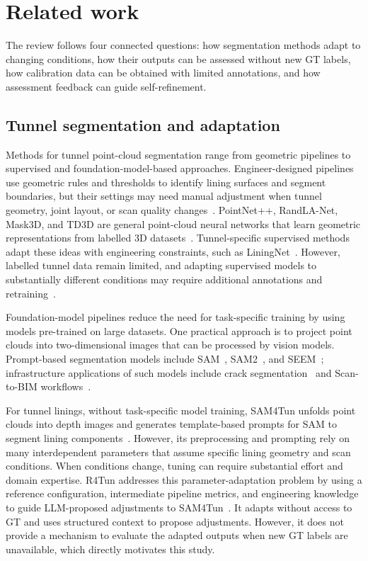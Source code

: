 \documentclass[a4paper,fleqn]{cas-dc}
\begin{document}
\section{Related work}
\label{sec:related}

The review follows four connected questions: how segmentation methods adapt to changing conditions, how their outputs can be assessed without new GT labels, how calibration data can be obtained with limited annotations, and how assessment feedback can guide self-refinement.

\subsection{Tunnel segmentation and adaptation}

Methods for tunnel point-cloud segmentation range from geometric pipelines to supervised and foundation-model-based approaches. Engineer-designed pipelines use geometric rules and thresholds to identify lining surfaces and segment boundaries, but their settings may need manual adjustment when tunnel geometry, joint layout, or scan quality changes~\cite{huang2021bim,weidner2024generalized,wang2025automated}. PointNet++, RandLA-Net, Mask3D, and TD3D are general point-cloud neural networks that learn geometric representations from labelled 3D datasets~\cite{qi2017pointnet,hu2020randla,schult2023mask3d,kolodiazhnyi2024td3d}. Tunnel-specific supervised methods adapt these ideas with engineering constraints, such as LiningNet~\cite{lin2025liningnet}. However, labelled tunnel data remain limited, and adapting supervised models to substantially different conditions may require additional annotations and retraining~\cite{su2024review, cha2024deep}.

Foundation-model pipelines reduce the need for task-specific training by using models pre-trained on large datasets. One practical approach is to project point clouds into two-dimensional images that can be processed by vision models. Prompt-based segmentation models include SAM~\cite{kirillov2023sam}, SAM2~\cite{ravi2024sam2}, and SEEM~\cite{zou2023segment}; infrastructure applications of such models include crack segmentation~\cite{ge2024cracksam,ye2024sam} and Scan-to-BIM workflows~\cite{wang2024omni,pan2024zero,ye2026maintenance}. 

For tunnel linings,  without task-specific model training, SAM4Tun unfolds point clouds into depth images and generates template-based prompts for SAM to segment lining components~\cite{ye2025sam4tun}. However, its preprocessing and prompting rely on many interdependent parameters that assume specific lining geometry and scan conditions. When conditions change, tuning can require substantial effort and domain expertise. R4Tun addresses this parameter-adaptation problem by using a reference configuration, intermediate pipeline metrics, and engineering knowledge to guide LLM-proposed adjustments to SAM4Tun~\cite{taoR4Tun}. It adapts without access to GT and uses structured context to propose adjustments. However, it does not provide a mechanism to evaluate the adapted outputs when new GT labels are unavailable, which directly motivates this study.
\end{document}
